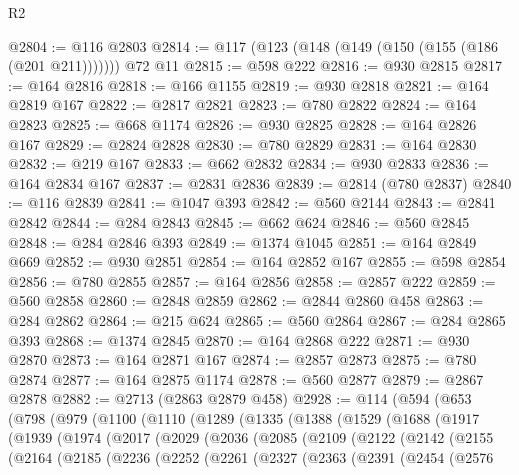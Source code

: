 \begin{lexlean}{R2}
\begin{coremodule}
@2804 := @116 @2803
@2814 := @117 (@123 (@148 (@149 (@150 (@155 (@186 (@201 @211))))))) @72 @11
@2815 := @598 @222
@2816 := @930 @2815
@2817 := @164 @2816
@2818 := @166 @1155
@2819 := @930 @2818
@2821 := @164 @2819 @167
@2822 := @2817 @2821
@2823 := @780 @2822
@2824 := @164 @2823
@2825 := @668 @1174
@2826 := @930 @2825
@2828 := @164 @2826 @167
@2829 := @2824 @2828
@2830 := @780 @2829
@2831 := @164 @2830
@2832 := @219 @167
@2833 := @662 @2832
@2834 := @930 @2833
@2836 := @164 @2834 @167
@2837 := @2831 @2836
@2839 := @2814 (@780 @2837)
@2840 := @116 @2839
@2841 := @1047 @393
@2842 := @560 @2144
@2843 := @2841 @2842
@2844 := @284 @2843
@2845 := @662 @624
@2846 := @560 @2845
@2848 := @284 @2846 @393
@2849 := @1374 @1045
@2851 := @164 @2849 @669
@2852 := @930 @2851
@2854 := @164 @2852 @167
@2855 := @598 @2854
@2856 := @780 @2855
@2857 := @164 @2856
@2858 := @2857 @222
@2859 := @560 @2858
@2860 := @2848 @2859
@2862 := @2844 @2860 @458
@2863 := @284 @2862
@2864 := @215 @624
@2865 := @560 @2864
@2867 := @284 @2865 @393
@2868 := @1374 @2845
@2870 := @164 @2868 @222
@2871 := @930 @2870
@2873 := @164 @2871 @167
@2874 := @2857 @2873
@2875 := @780 @2874
@2877 := @164 @2875 @1174
@2878 := @560 @2877
@2879 := @2867 @2878
@2882 := @2713 (@2863 @2879 @458)
@2928 := @114
    (@594
      (@653
        (@798
          (@979
            (@1100
              (@1110
                (@1289
                  (@1335
                    (@1388
                      (@1529
                        (@1688
                          (@1917
                            (@1939
                              (@1974
                                (@2017
                                  (@2029
                                    (@2036
                                      (@2085
                                        (@2109
                                          (@2122
                                            (@2142
                                              (@2155
                                                (@2164
                                                  (@2185
                                                    (@2236
                                                      (@2252
                                                        (@2261
                                                          (@2327
                                                            (@2363
                                                              (@2391
                                                                (@2454
                                                                  (@2576

\end{coremodule}
\end{lexlean}
